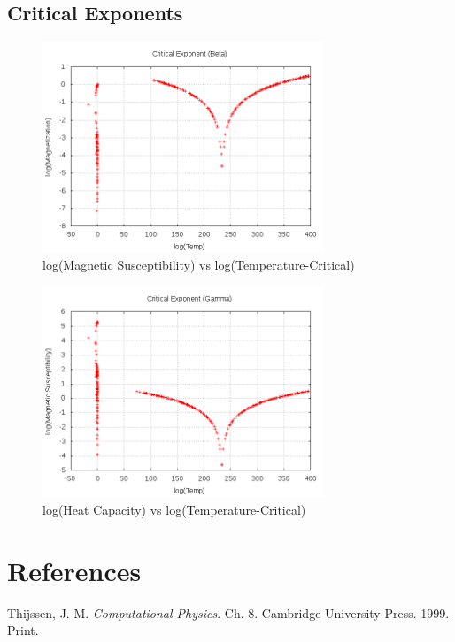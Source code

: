 \documentclass[letterpaper,12pt]{article}
\numberwithin{equation}{subsection}
\begin{document}
\subsection{Critical Exponents}
\begin{figure}[H]
        \centering
        \caption{log(Magnetic Susceptibility) vs log(Temperature-Critical) \label{fig:logchivslogT}}
                \centering
                \includegraphics[width=0.75\textwidth]{Beta.png}
\end{figure}
\begin{figure}[H]
        \centering
        \caption{log(Heat Capacity) vs log(Temperature-Critical) \label{fig:logCvslogT}}
                \centering
                \includegraphics[width=0.75\textwidth]{Gamma.png}
\end{figure}


\newpage
\thispagestyle{empty}
\mbox{}

\newpage
\section{References}
\begin{thebibliography}{99}
 Thijssen, J. M. \textit{Computational Physics}. Ch. 8. Cambridge University Press. 1999. Print.
\end{thebibliography}
\end{document}
